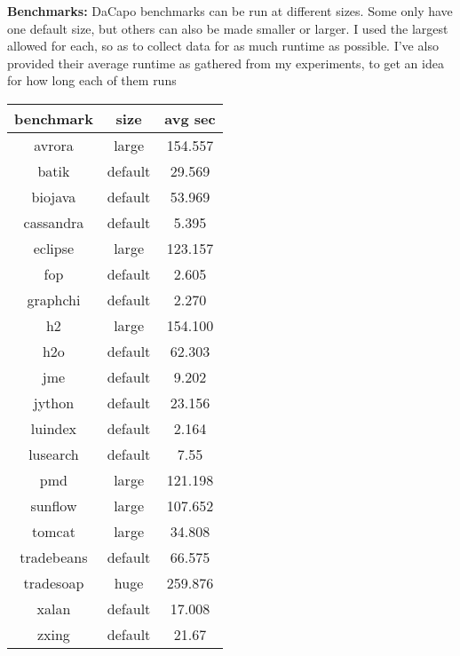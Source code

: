     \textbf{Benchmarks:}
        DaCapo benchmarks can be run at different sizes. Some only have one default size, but others can also be made smaller or larger. I used the largest allowed for each, so as to collect data for as much runtime as possible. I've also provided their average runtime as gathered from my experiments, to get an idea for how long each of them runs 

                    \begin{center}
                      \begin{tabular}{| c || c || c |}
                      \hline
                      \textbf{benchmark} &   \textbf{size}    & \textbf{avg sec}\\
                      \hline\hline
                      avrora	&	large	&   154.557 \\
                      batik     &	default	&   29.569    \\
                      biojava   &	default	&   53.969    \\
                      cassandra	&	default	&   5.395    \\
                      eclipse	&	large	&   123.157    \\
                      fop       &	default	&   2.605    \\
                      graphchi	&	default	&   2.270    \\
                      h2        &	large	&   154.100    \\
                      h2o       &	default	&   62.303    \\
                      jme       &	default	&   9.202    \\
                      jython	&	default	&   23.156    \\
                      luindex	&	default	&   2.164    \\
                      lusearch	&	default	&   7.55    \\
                      pmd       &	large	&   121.198    \\
                      sunflow	&	large	&   107.652    \\
                      tomcat	&	large	&   34.808    \\
                      tradebeans&	default	&   66.575    \\
                      tradesoap	&	huge	&   259.876     \\
                      xalan     &	default &   17.008    \\
                      zxing     &	default &   21.67    \\
                     \hline
                    \end{tabular}
                    \end{center}

